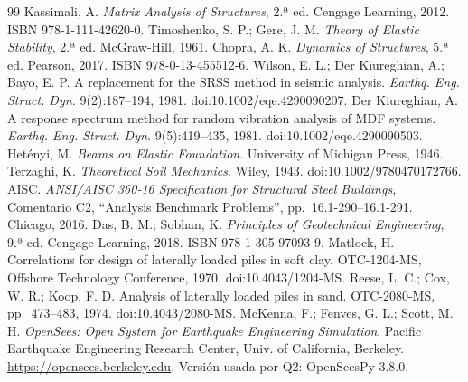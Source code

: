 \begin{thebibliography}{99}
 Kassimali, A. \emph{Matrix Analysis of Structures}, 2.ª ed. Cengage Learning, 2012. ISBN 978-1-111-42620-0.
 Timoshenko, S. P.; Gere, J. M. \emph{Theory of Elastic Stability}, 2.ª ed. McGraw-Hill, 1961.
 Chopra, A. K. \emph{Dynamics of Structures}, 5.ª ed. Pearson, 2017. ISBN 978-0-13-455512-6.
 Wilson, E. L.; Der Kiureghian, A.; Bayo, E. P. A replacement for the SRSS method in seismic analysis. \emph{Earthq. Eng. Struct. Dyn.} 9(2):187--194, 1981. doi:10.1002/eqe.4290090207.
 Der Kiureghian, A. A response spectrum method for random vibration analysis of MDF systems. \emph{Earthq. Eng. Struct. Dyn.} 9(5):419--435, 1981. doi:10.1002/eqe.4290090503.
 Hetényi, M. \emph{Beams on Elastic Foundation}. University of Michigan Press, 1946.
 Terzaghi, K. \emph{Theoretical Soil Mechanics}. Wiley, 1943. doi:10.1002/9780470172766.
 AISC. \emph{ANSI/AISC 360-16 Specification for Structural Steel Buildings}, Comentario C2, ``Analysis Benchmark Problems'', pp.~16.1-290--16.1-291. Chicago, 2016.
 Das, B. M.; Sobhan, K. \emph{Principles of Geotechnical Engineering}, 9.ª ed. Cengage Learning, 2018. ISBN 978-1-305-97093-9.
 Matlock, H. Correlations for design of laterally loaded piles in soft clay. OTC-1204-MS, Offshore Technology Conference, 1970. doi:10.4043/1204-MS.
 Reese, L. C.; Cox, W. R.; Koop, F. D. Analysis of laterally loaded piles in sand. OTC-2080-MS, pp.~473--483, 1974. doi:10.4043/2080-MS.
 McKenna, F.; Fenves, G. L.; Scott, M. H. \emph{OpenSees: Open System for Earthquake Engineering Simulation}. Pacific Earthquake Engineering Research Center, Univ. of California, Berkeley. \url{https://opensees.berkeley.edu}. Versión usada por Q2: OpenSeesPy 3.8.0.
\end{thebibliography}
